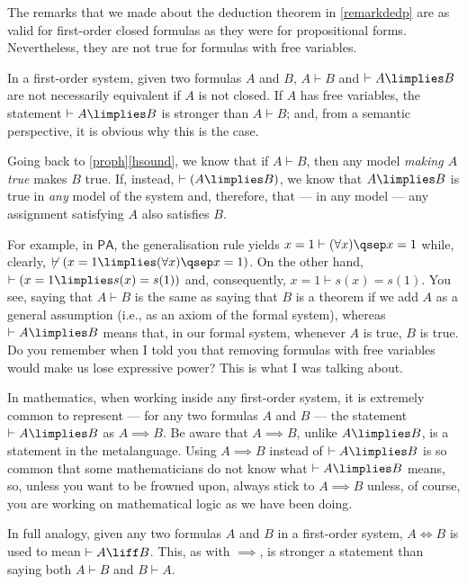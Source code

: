 \begin{para}
The remarks that we made about the deduction theorem in \ref{remarkdedp} are as valid for first-order closed formulas as they were for propositional forms. Nevertheless, they are not true for formulas with free variables.

In a first-order system, given two formulas $A$ and $B$, $A\vdash B$ and $\vdash A\limplies B$ are not necessarily equivalent if $A$ is not closed.
If $A$ has free variables, the statement $\vdash A \limplies B$ is stronger than $A \vdash B$; and, from a semantic perspective, it is obvious why this is the case.

Going back to \ref{proph}\ref{hsound}, we know that if $A\vdash B$, then any model \emph{making $A$ true} makes $B$ true.
If, instead, $\vdash (A\limplies B)$, we know that $A\limplies B$ is true in \emph{any} model of the system and, therefore, that --- in any model --- any assignment satisfying $A$ also satisfies $B$.

For example, in $\mathsf{PA}$, the generalisation rule yields $x = 1 \vdash (\forall x)\qsep x = 1$ while, clearly, $\not\vdash (x = 1 \limplies (\forall x)\qsep x = 1)$. On the other hand, $\vdash (x = 1 \limplies s(x)  = s(1))$ and, consequently, $x = 1 \vdash s(x) = s(1)$.
You see, saying that $A \vdash B$ is the same as saying that $B$ is a theorem if we add $A$ as a general assumption (i.e., as an axiom of the formal system), whereas $\vdash A \limplies B$ means that, in our formal system, whenever $A$ is true, $B$ is true.
Do you remember when I told you that removing formulas with free variables would make us lose expressive power? This is what I was talking about. 

In mathematics, when working inside any first-order system, it is extremely common to represent --- for any two formulas $A$ and $B$ --- the statement $\vdash A\limplies B$ as $A\implies B$.
Be aware that $A\implies B$, unlike $A\limplies B$, is a statement in the metalanguage.
Using $A\implies B$ instead of $\vdash A\limplies B$ is so common that some mathematicians do not know what $\vdash A \limplies B$ means, so, unless you want to be frowned upon, always stick to $A\implies B$ unless, of course, you are working on mathematical logic as we have been doing.

In full analogy, given any two formulas $A$ and $B$ in a first-order system, $A\iff B$ is used to mean $\vdash A\liff B$. This, as with $\implies$, is stronger a statement than saying both $A\vdash B$ and $B\vdash A$.
\end{para}

